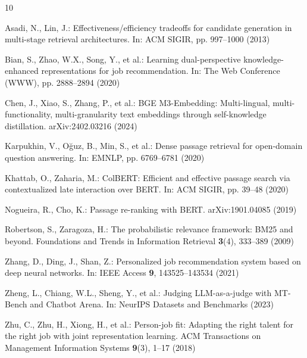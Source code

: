 \documentclass[runningheads]{llncs}
\begin{document}
\begin{thebibliography}{10}

Asadi, N., Lin, J.: Effectiveness/efficiency tradeoffs for candidate generation in multi-stage retrieval architectures. In: ACM SIGIR, pp. 997--1000 (2013)

Bian, S., Zhao, W.X., Song, Y., et al.: Learning dual-perspective knowledge-enhanced representations for job recommendation. In: The Web Conference (WWW), pp. 2888--2894 (2020)

Chen, J., Xiao, S., Zhang, P., et al.: BGE M3-Embedding: Multi-lingual, multi-functionality, multi-granularity text embeddings through self-knowledge distillation. arXiv:2402.03216 (2024)

Karpukhin, V., O{\u{g}}uz, B., Min, S., et al.: Dense passage retrieval for open-domain question answering. In: EMNLP, pp. 6769--6781 (2020)

Khattab, O., Zaharia, M.: ColBERT: Efficient and effective passage search via contextualized late interaction over BERT. In: ACM SIGIR, pp. 39--48 (2020)

Nogueira, R., Cho, K.: Passage re-ranking with BERT. arXiv:1901.04085 (2019)

Robertson, S., Zaragoza, H.: The probabilistic relevance framework: BM25 and beyond. Foundations and Trends in Information Retrieval \textbf{3}(4), 333--389 (2009)

Zhang, D., Ding, J., Shan, Z.: Personalized job recommendation system based on deep neural networks. In: IEEE Access \textbf{9}, 143525--143534 (2021)

Zheng, L., Chiang, W.L., Sheng, Y., et al.: Judging LLM-as-a-judge with MT-Bench and Chatbot Arena. In: NeurIPS Datasets and Benchmarks (2023)

Zhu, C., Zhu, H., Xiong, H., et al.: Person-job fit: Adapting the right talent for the right job with joint representation learning. ACM Transactions on Management Information Systems \textbf{9}(3), 1--17 (2018)

\end{thebibliography}
\end{document}
